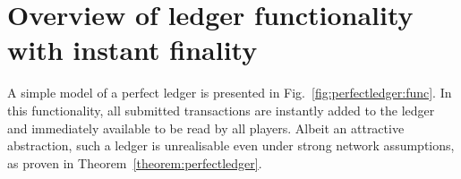 \section{Overview of ledger functionality with instant finality}
  A simple model of a perfect ledger is presented in
  Fig.~\ref{fig:perfectledger:func}. In this functionality, all submitted
  transactions are instantly added to the ledger and immediately available to be
  read by all players. Albeit an attractive abstraction, such a ledger is
  unrealisable even under strong network assumptions, as proven in
  Theorem~\ref{theorem:perfectledger}. 
